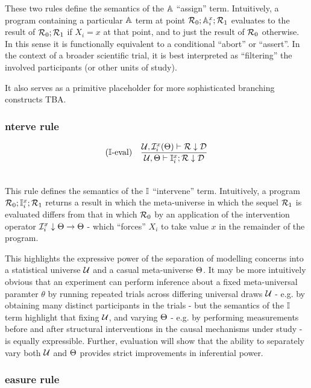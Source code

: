 \documentclass{article}
\begin{document}
These two rules define the semantics of the $\mathbb{A}$ ``assign'' term. Intuitively, a program containing a particular $\mathbb{A}$ term at point $\mathcal{R}_0; \mathbb{A}_i^x; \mathcal{R}_1$ evaluates to the result of $\mathcal{R}_0; \mathcal{R}_1$ if $X_i = x$ at that point, and to just the result of $\mathcal{R}_0$ otherwise. In this sense it is functionally equivalent to a conditional ``abort'' or ``assert''. In the context of a broader scientific trial, it is best interpreted as ``filtering'' the involved participants (or other units of study).

It also serves as a primitive placeholder for more sophisticated branching constructs TBA.

\subsubsection{\I nterve rule}

\begin{align*}  
  (\mathbb{I}\text{-eval}) &\quad \frac{\mathcal{U}, \mathcal{I}_i^x(\Theta) \vdash \mathcal{R} \downarrow \mathcal{D}}{\mathcal{U}, \Theta \vdash \mathbb{I}_i^x; \mathcal{R} \downarrow \mathcal{D}} \\[1.5em]
\end{align*}

This rule defines the semantics of the $\mathbb{I}$ ``intervene'' term. Intuitively, a program $\mathcal{R}_0; \mathbb{I}_i^x; \mathcal{R}_1$ returns a result in which the meta-universe in which the sequel $\mathcal{R}_1$ is evaluated differs from that in which $\mathcal{R}_0$ by an application of the intervention operator $\mathcal{I}_i^x\downarrow \Theta \to \Theta$ - which ``forces'' $X_i$ to take value $x$ in the remainder of the program.

This highlights the expressive power of the separation of modelling concerns into a statistical universe $\mathcal{U}$ and a casual meta-universe $\Theta$. It may be more intuitively obvious that an experiment can perform inference about a fixed meta-universal paramter $\theta$ by running repeated trials across differing universal draws $\mathcal{U}$ - e.g. by obtaining many distinct participants in the trials - but the semantics of the $\mathbb{I}$ term highlight that fixing $\mathcal{U}$, and varying $\Theta$ - e.g. by performing measurements before and after structural interventions in the causal mechanisms under study - is equally expressible. Further, evaluation will show that the ability to separately vary both $\mathcal{U}$ and $\Theta$ provides strict improvements in inferential power.

\subsubsection{\M easure rule}
\end{document}
